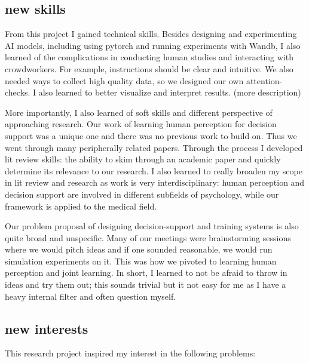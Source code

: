 \subsection{new skills}
From this project I gained technical skills. Besides designing and experimenting AI models, including using pytorch and running experiments with Wandb, I also learned of the complications in conducting human studies and interacting with crowdworkers. For example, instructions should be clear and intuitive. We also needed ways to collect high quality data, so we designed our own attention-checks. I also learned to better visualize and interpret results. (more description)

More importantly, I also learned of soft skills and different perspective of approaching research. Our work of learning human perception for decision support was a unique one and there was no previous work to build on. Thus we went through many peripherally related papers. Through the process I developed lit review skills: the ability to skim through an academic paper and quickly determine its relevance to our research. I also learned to really broaden my scope in lit review and research as work is very interdisciplinary: human perception and decision support are involved in different subfields of psychology, while our framework is applied to the medical field. 

Our problem proposal of designing decision-support and training systems is also quite broad and unspecific. Many of our meetings were brainstorming sessions where we would pitch ideas and if one sounded reasonable, we would run simulation experiments on it. This was how we pivoted to learning human perception and joint learning. In short, I learned to not be afraid to throw in ideas and try them out; this sounds trivial but it not easy for me as I have a heavy internal filter and often question myself.



\subsection{new interests}
This research project inspired my interest in the following problems: \\

